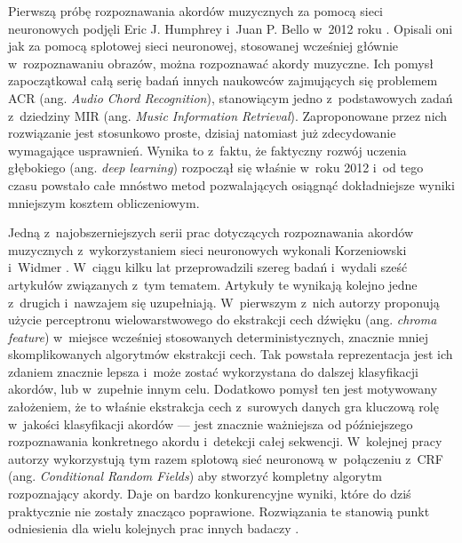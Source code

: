 Pierwszą próbę rozpoznawania akordów muzycznych za pomocą sieci neuronowych podjęli Eric J. Humphrey i~Juan P. Bello w~2012 roku \cite{humphrey_rethinking_2012}. Opisali oni jak za pomocą splotowej sieci neuronowej, stosowanej wcześniej głównie w~rozpoznawaniu obrazów, można rozpoznawać akordy muzyczne. Ich pomysł zapoczątkował całą serię badań innych naukowców zajmujących się problemem ACR (ang. \emph{Audio Chord Recognition}), stanowiącym jedno z~podstawowych zadań z~dziedziny MIR (ang. \emph{Music Information Retrieval}). Zaproponowane przez nich rozwiązanie jest stosunkowo proste, dzisiaj natomiast już zdecydowanie wymagające usprawnień. Wynika to z~faktu, że faktyczny rozwój uczenia głębokiego (ang. \emph{deep learning}) rozpoczął się właśnie w~roku 2012 i~od tego czasu powstało całe mnóstwo metod pozwalających osiągnąć dokładniejsze wyniki mniejszym kosztem obliczeniowym.

Jedną z~najobszerniejszych serii prac dotyczących rozpoznawania akordów muzycznych z~wykorzystaniem sieci neuronowych wykonali Korzeniowski i~Widmer \cite{korzeniowski_feature_2016,korzeniowski_fully_2016,korzeniowski_futility_2017,korzeniowski_improved_2018,korzeniowski_automatic_2018,korzeniowski_large-scale_2018}. W~ciągu kilku lat przeprowadzili szereg badań i~wydali sześć artykułów związanych z~tym tematem. Artykuły te wynikają kolejno jedne z~drugich i~nawzajem się uzupełniają. W~pierwszym z~nich \cite{korzeniowski_feature_2016} autorzy proponują użycie perceptronu wielowarstwowego do ekstrakcji cech dźwięku (ang. \emph{chroma feature}) w~miejsce wcześniej stosowanych deterministycznych, znacznie mniej skomplikowanych algorytmów ekstrakcji cech. Tak powstała reprezentacja jest ich zdaniem znacznie lepsza i~może zostać wykorzystana do dalszej klasyfikacji akordów, lub w~zupełnie innym celu. Dodatkowo pomysł ten jest motywowany założeniem, że to właśnie ekstrakcja cech z~surowych danych gra kluczową rolę w~jakości klasyfikacji akordów --- jest znacznie ważniejsza od późniejszego rozpoznawania konkretnego akordu i~detekcji całej sekwencji. W~kolejnej pracy \cite{korzeniowski_fully_2016} autorzy wykorzystują tym razem splotową sieć neuronową w~połączeniu z~CRF (ang. \emph{Conditional Random Fields}) aby stworzyć kompletny algorytm rozpoznający akordy. Daje on bardzo konkurencyjne wyniki, które do dziś praktycznie nie zostały znacząco poprawione. Rozwiązania te stanowią punkt odniesienia dla wielu kolejnych prac innych badaczy \cite{ohanlon_fifthnet_2021, park_bi-directional_2019}.

